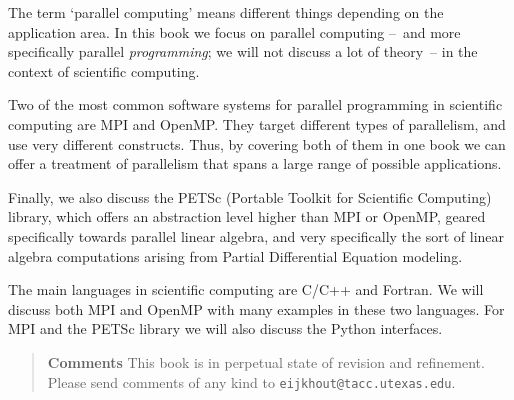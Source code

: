 
The term `parallel computing' means different things
depending on the application area. In this book we focus
on parallel computing
--~and more specifically parallel \emph{programming};
we will not discuss a lot of theory~--
in the context of scientific computing.

Two of the most common software systems for parallel programming
in scientific computing are MPI and OpenMP.
They target different types of parallelism,
and use very different constructs. 
Thus, by covering both of them in one book
we can offer a treatment of parallelism that
spans a large range of possible applications.

Finally, we also discuss the PETSc
(Portable Toolkit for Scientific Computing)
library, which offers an abstraction level higher than
MPI or OpenMP, geared specifically towards
parallel linear algebra,
and very specifically the sort of linear algebra
computations arising from Partial Differential Equation modeling.

The main languages in scientific computing are C/C++ and Fortran.
We will discuss both MPI and OpenMP with many examples in these two languages.
For MPI and the PETSc library we will also discuss the Python interfaces.

\begin{quotation}
  \textbf{Comments} This book is in perpetual state of revision and refinement.
  Please send comments of any kind to \texttt{eijkhout@tacc.utexas.edu}.
\end{quotation}
